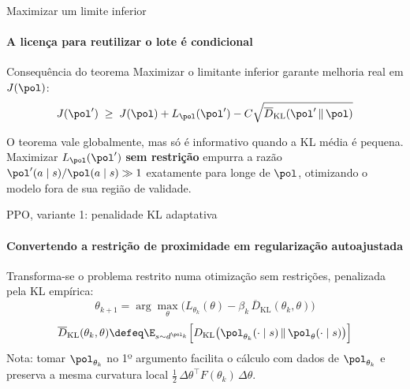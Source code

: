 \documentclass[aspectratio=169, 11pt]{beamer}
\newcommand{\KL}{D_{\mathrm{KL}}}
\newcommand{\KLbar}{\overline{D}_{\mathrm{KL}}}
\begin{document}
\begin{frame}{Maximizar um limite inferior}
  \framesubtitle{A licença para reutilizar o lote é condicional}

  \begin{teobox}{Consequência do teorema}
    Maximizar o limitante inferior garante melhoria real em $J(\pol)$:
    \[
      J(\pol') \;\ge\; J(\pol) + L_{\pol}(\pol') - C\sqrt{\KLbar(\pol'\,\|\,\pol)}
    \]
  \end{teobox}

  \begin{alertabox}[title={Mas atenção}]
    O teorema vale globalmente, mas só é informativo quando a KL média é pequena.
    Maximizar $L_{\pol}(\pol')$ \textbf{sem restrição} empurra a razão
    $\pol'(a\mid s)/\pol(a\mid s)\gg 1$ exatamente para longe de $\pol$, otimizando o modelo
    fora de sua região de validade.
  \end{alertabox}
\end{frame}

\begin{frame}{PPO, variante 1: penalidade KL adaptativa}
  \framesubtitle{Convertendo a restrição de proximidade em regularização autoajustada}

  Transforma-se o problema restrito numa otimização sem restrições, penalizada pela KL empírica:
  \[
    \theta_{k+1} = \arg\max_\theta\Big(L_{\theta_k}(\theta) - \beta_k\,\KLbar(\theta_k,\theta)\Big)
  \]
  \[
    \KLbar(\theta_k,\theta) \defeq \E_{s\sim d^{\pol_k}}\Big[\KL\big(\pol_{\theta_k}(\cdot\mid s)\,\|\,\pol_\theta(\cdot\mid s)\big)\Big]
  \]
  {\small\color{rlCinza} Nota: tomar $\pol_{\theta_k}$ no 1º argumento facilita o cálculo com dados de
  $\pol_{\theta_k}$ e preserva a mesma curvatura local $\tfrac12\,\Delta\theta^\top F(\theta_k)\,\Delta\theta$.}
\end{frame}
\end{document}

